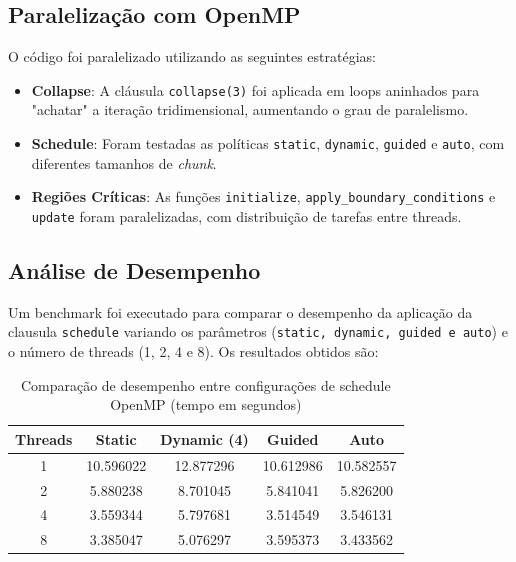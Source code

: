 \documentclass[a4paper, 12pt]{article}
\begin{document}
	\subsection{Paralelização com OpenMP}  
	O código foi paralelizado utilizando as seguintes estratégias:  
	\begin{itemize}  
		\item \textbf{Collapse}: A cláusula \texttt{collapse(3)} foi aplicada em loops aninhados para "achatar" a iteração tridimensional, aumentando o grau de paralelismo.  
		\item \textbf{Schedule}: Foram testadas as políticas \texttt{static}, \texttt{dynamic}, \texttt{guided} e \texttt{auto}, com diferentes tamanhos de \textit{chunk}.  
		\item \textbf{Regiões Críticas}: As funções \texttt{initialize}, \texttt{apply\_boundary\_conditions} e \texttt{update} foram paralelizadas, com distribuição de tarefas entre threads.  
	\end{itemize}  
	
	\subsection{Análise de Desempenho}  
	Um benchmark foi executado para comparar o desempenho da aplicação da clausula \texttt{schedule} variando os parâmetros (\texttt{static, dynamic,  guided e auto}) e o número de threads (1, 2, 4 e 8). Os resultados obtidos são:
	
	\begin{table}[htbp]
		\centering
		\caption{Comparação de desempenho entre configurações de schedule OpenMP (tempo em segundos)}
		
		\vspace{1cm}
		\begin{tabular}{|c|c|c|c|c|}
			\hline
			\textbf{Threads} & \textbf{Static} & \textbf{Dynamic (4)} & \textbf{Guided} & \textbf{Auto} \\
			\hline
			1 & 10.596022 & 12.877296 & 10.612986 & 10.582557 \\
			\hline
			2 & 5.880238 & 8.701045 & 5.841041 & 5.826200 \\
			\hline
			4 & 3.559344 & 5.797681 & 3.514549 & 3.546131 \\
			\hline
			8 & 3.385047 & 5.076297 & 3.595373 & 3.433562 \\
			\hline
		\end{tabular}
		\label{tab:openmp_schedule_performance}
	\end{table}  
	
\end{document}
